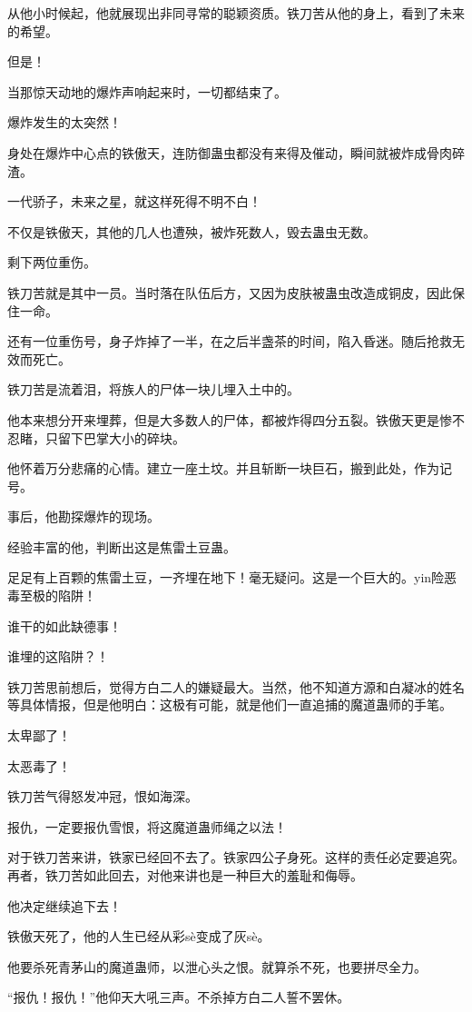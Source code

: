 \begin{this_body}
从他小时候起，他就展现出非同寻常的聪颖资质。铁刀苦从他的身上，看到了未来的希望。

但是！

当那惊天动地的爆炸声响起来时，一切都结束了。

爆炸发生的太突然！

身处在爆炸中心点的铁傲天，连防御蛊虫都没有来得及催动，瞬间就被炸成骨肉碎渣。

一代骄子，未来之星，就这样死得不明不白！

不仅是铁傲天，其他的几人也遭殃，被炸死数人，毁去蛊虫无数。

剩下两位重伤。

铁刀苦就是其中一员。当时落在队伍后方，又因为皮肤被蛊虫改造成铜皮，因此保住一命。

还有一位重伤号，身子炸掉了一半，在之后半盏茶的时间，陷入昏迷。随后抢救无效而死亡。

铁刀苦是流着泪，将族人的尸体一块儿埋入土中的。

他本来想分开来埋葬，但是大多数人的尸体，都被炸得四分五裂。铁傲天更是惨不忍睹，只留下巴掌大小的碎块。

他怀着万分悲痛的心情。建立一座土坟。并且斩断一块巨石，搬到此处，作为记号。

事后，他勘探爆炸的现场。

经验丰富的他，判断出这是焦雷土豆蛊。

足足有上百颗的焦雷土豆，一齐埋在地下！毫无疑问。这是一个巨大的。yin险恶毒至极的陷阱！

谁干的如此缺德事！

谁埋的这陷阱？！

铁刀苦思前想后，觉得方白二人的嫌疑最大。当然，他不知道方源和白凝冰的姓名等具体情报，但是他明白：这极有可能，就是他们一直追捕的魔道蛊师的手笔。

太卑鄙了！

太恶毒了！

铁刀苦气得怒发冲冠，恨如海深。

报仇，一定要报仇雪恨，将这魔道蛊师绳之以法！

对于铁刀苦来讲，铁家已经回不去了。铁家四公子身死。这样的责任必定要追究。再者，铁刀苦如此回去，对他来讲也是一种巨大的羞耻和侮辱。

他决定继续追下去！

铁傲天死了，他的人生已经从彩sè变成了灰sè。

他要杀死青茅山的魔道蛊师，以泄心头之恨。就算杀不死，也要拼尽全力。

“报仇！报仇！”他仰天大吼三声。不杀掉方白二人誓不罢休。


\end{this_body}
